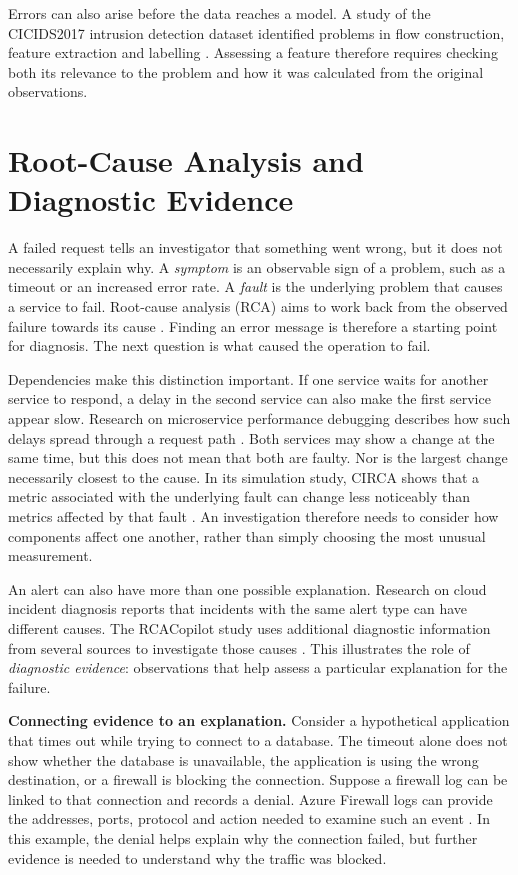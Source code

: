 Errors can also arise before the data reaches a model. A study of the
CICIDS2017 intrusion detection dataset identified problems in flow
construction, feature extraction and labelling
\parencite{engelen2021troubleshooting}. Assessing a feature therefore
requires checking both its relevance to the problem and how it was
calculated from the original observations.


\section{Root-Cause Analysis and Diagnostic Evidence}
\label{sec:background:root-cause-analysis}

A failed request tells an investigator that something went wrong, but it
does not necessarily explain why. A \emph{symptom} is an observable sign
of a problem, such as a timeout or an increased error rate. A \emph{fault}
is the underlying problem that causes a service to fail.
Root-cause analysis (RCA) aims to work back from the observed failure
towards its cause \parencite{li2022circa}. Finding an error message is
therefore a starting point for diagnosis. The next question is what
caused the operation to fail.

Dependencies make this distinction important. If one service waits for
another service to respond, a delay in the second service can also make
the first service appear slow. Research on microservice performance
debugging describes how such delays spread through a request path
\parencite{gan2021sage}. Both services may show a change at the same time,
but this does not mean that both are faulty. Nor is the largest change
necessarily closest to the cause. In its simulation study, CIRCA shows that a
metric associated with the underlying fault can change less noticeably
than metrics affected by that fault \parencite{li2022circa}. An investigation
therefore needs to consider how components affect one another, rather
than simply choosing the most unusual measurement.

An alert can also have more than one possible explanation. Research on
cloud incident diagnosis reports that incidents with the same alert type
can have different causes. The RCACopilot study uses additional diagnostic
information from several sources to investigate those causes
\parencite{chen2024rcacopilot}. This illustrates the role of
\emph{diagnostic evidence}: observations that help assess a particular
explanation for the failure.

\noindent\textbf{Connecting evidence to an explanation.} Consider a
hypothetical application that times out while trying to connect to a
database. The timeout alone does not show whether the database is
unavailable, the application is using the wrong destination, or a firewall
is blocking the connection. Suppose a firewall log can be linked to that
connection and records a denial. Azure Firewall logs can provide the
addresses, ports, protocol and action needed to examine such an event
\parencite{microsoft2026firewallmonitor}. In this example, the denial helps
explain why the connection failed, but further evidence is needed to
understand why the traffic was blocked.

